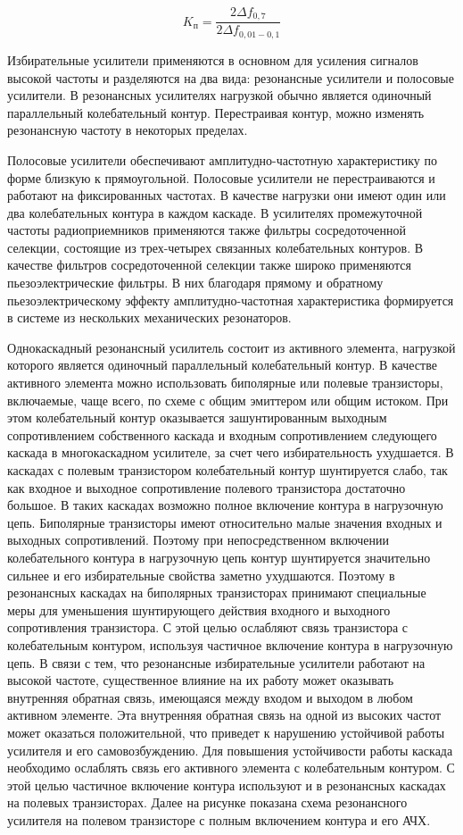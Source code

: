 \documentclass[unicode, 12pt, a4paper, oneside]{article}
\begin{document}
\begin{equation}
K_\text{п} = \dfrac{2\Delta f_{0,7}}{2\Delta f_{0,01 - 0,1}}
\end{equation}

Избирательные усилители применяются в основном для усиления сигналов высокой частоты и разделяются на два вида: резонансные усилители и полосовые усилители. В резонансных усилителях нагрузкой обычно является одиночный параллельный колебательный контур. Перестраивая контур, можно изменять резонансную частоту в некоторых пределах.

Полосовые усилители обеспечивают амплитудно-частотную характеристику по форме близкую к прямоугольной. Полосовые усилители не перестраиваются и работают на фиксированных частотах. В качестве нагрузки они имеют один или два колебательных контура в каждом каскаде. В усилителях промежуточной частоты радиоприемников применяются также фильтры сосредоточенной селекции, состоящие из трех-четырех связанных колебательных контуров. В качестве фильтров сосредоточенной селекции также широко применяются пьезоэлектрические фильтры. В них благодаря прямому и обратному пьезоэлектрическому эффекту амплитудно-частотная характеристика формируется в системе из нескольких механических резонаторов.

Однокаскадный резонансный усилитель состоит из активного элемента, нагрузкой которого является одиночный параллельный колебательный контур. В качестве активного элемента можно использовать биполярные или полевые транзисторы, включаемые, чаще всего, по схеме с общим эмиттером или общим истоком. При этом колебательный контур оказывается зашунтированным выходным сопротивлением собственного каскада и входным сопротивлением следующего каскада в многокаскадном усилителе, за счет чего избирательность ухудшается. В каскадах с полевым транзистором колебательный контур шунтируется слабо, так как входное и выходное сопротивление полевого транзистора достаточно большое. В таких каскадах возможно полное включение контура в нагрузочную цепь. Биполярные транзисторы имеют относительно малые значения входных и выходных сопротивлений. Поэтому при непосредственном включении колебательного контура в нагрузочную цепь контур шунтируется значительно сильнее и его избирательные свойства заметно ухудшаются. Поэтому в резонансных каскадах на биполярных транзисторах принимают специальные меры для уменьшения шунтирующего действия входного и выходного сопротивления транзистора. С этой целью ослабляют связь транзистора с колебательным контуром, используя частичное включение контура в нагрузочную цепь. В связи с тем, что резонансные избирательные усилители работают на высокой частоте, существенное влияние на их работу может оказывать внутренняя обратная связь, имеющаяся между входом и выходом в любом активном элементе. Эта внутренняя обратная связь на одной из высоких частот может оказаться положительной, что приведет к нарушению устойчивой работы усилителя и его самовозбуждению. Для повышения устойчивости работы каскада необходимо ослаблять связь его активного элемента с колебательным контуром. С этой целью частичное включение контура используют и в резонансных каскадах на полевых транзисторах. Далее на рисунке показана схема резонансного усилителя на полевом транзисторе с полным включением контура и его АЧХ.
\end{document}
